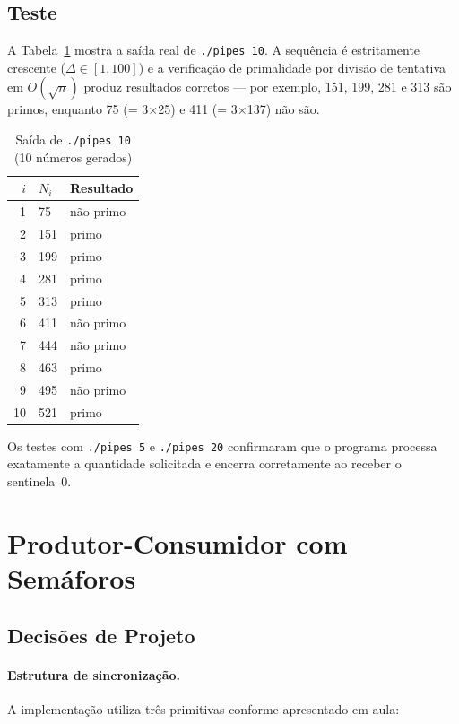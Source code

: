 \documentclass[12pt,a4paper]{article}
\begin{document}
\subsection{Teste}

A Tabela~\ref{tab:pipes10} mostra a saída real de \texttt{./pipes 10}.
A sequência é estritamente crescente ($\Delta \in [1,100]$) e a verificação
de primalidade por divisão de tentativa em $O(\sqrt{n})$ produz resultados
corretos — por exemplo, 151, 199, 281 e 313 são primos, enquanto 75 (= 3$\times$25)
e 411 (= 3$\times$137) não são.

\begin{table}[H]
\centering
\caption{Saída de \texttt{./pipes 10} (10 números gerados)}
\label{tab:pipes10}
\begin{tabular}{rll}
\toprule
$i$ & $N_i$ & Resultado \\
\midrule
1  &  75 & não primo \\
2  & 151 & primo \\
3  & 199 & primo \\
4  & 281 & primo \\
5  & 313 & primo \\
6  & 411 & não primo \\
7  & 444 & não primo \\
8  & 463 & primo \\
9  & 495 & não primo \\
10 & 521 & primo \\
\bottomrule
\end{tabular}
\end{table}

Os testes com \texttt{./pipes 5} e \texttt{./pipes 20} confirmaram que o
programa processa exatamente a quantidade solicitada e encerra corretamente
ao receber o sentinela~0.

\section{Produtor-Consumidor com Semáforos}

\subsection{Decisões de Projeto}

\paragraph{Estrutura de sincronização.}
A implementação utiliza três primitivas conforme apresentado em aula:
\end{document}
